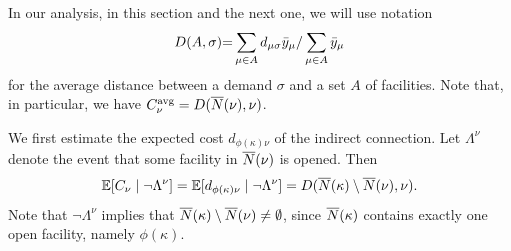 \documentclass[oneside,final]{ucr}
\begin{document}
In our analysis, in this section and the next one, we will use notation
%
\begin{equation*}
D(A,\sigma) {=} \sum_{\mu\in A}
d_{\mu\sigma}{\bar y}_{\mu}/\sum_{\mu\in A} {\bar y}_{\mu}
\end{equation*}
%
for the average distance between a demand $\sigma$ and a set $A$ of facilities.
Note that, in particular, we have $C^{{\mbox{\scriptsize\rm avg}}}_\nu = D({\overline{N}}(\nu),\nu)$.

We first estimate the expected cost $d_{\phi(\kappa)\nu}$ of the indirect
connection. Let $\Lambda^\nu$ denote the event that some 
facility in ${\overline{N}}(\nu)$ is opened. Then
%
\begin{equation}
	\mathbb{E}[C_\nu \mid\neg\Lambda^\nu] 
	=   \mathbb{E}[ d_{\phi(\kappa)\nu} \mid \neg\Lambda^\nu] 
	= 	D({\overline{N}}(\kappa) \setminus {\overline{N}}(\nu), \nu).
			\label{eqn: expected indirect connection}
\end{equation}
%
Note that $\neg\Lambda^\nu$ implies that ${\overline{N}}(\kappa) \setminus
{\overline{N}}(\nu)\neq\emptyset$, since ${\overline{N}}(\kappa)$ contains
exactly one open facility, namely $\phi(\kappa)$.

\end{document}
